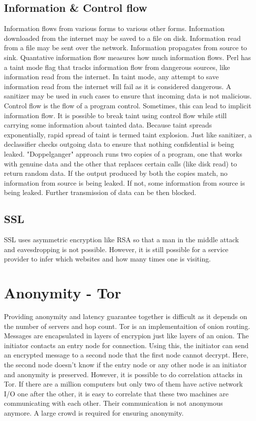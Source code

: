 \documentclass[twoside]{article}
\begin{document}
\subsection{Information \& Control flow}
Information flows from various forms to various other forms. Information downloaded from the internet may be saved to a file on disk. Information read from a file may be sent over the network. Information propagates from source to sink. Quantative information flow measures how much information flows. Perl has a taint mode flag that tracks information flow from dangerous sources, like information read from the internet. In taint mode, any attempt to save information read from the internet will fail as it is considered dangerous. A sanitizer may be used in such cases to ensure that incoming data is not malicious. Control flow is the flow of a program control. Sometimes, this can lead to implicit information flow. It is possible to break taint using control flow while still carrying some information about tainted data. Because taint spreads exponentially, rapid spread of taint is termed taint explosion. Just like sanitizer, a declassifier checks outgoing data to ensure that nothing confidential is being leaked. "Doppelganger" approach runs two copies of a program, one that works with genuine data and the other that replaces certain calls (like disk read) to return random data. If the output produced by both the copies match, no information from source is being leaked. If not, some information from source is being leaked. Further transmission of data can be then blocked. 

\subsection{SSL}
SSL uses asymmetric encryption like RSA so that a man in the middle attack and eavesdropping is not possible. However, it is still possible for a service provider to infer which websites and how many times one is visiting.

\section{Anonymity - Tor}
Providing anonymity and latency guarantee together is difficult as it depends on the number of servers and hop count. Tor is an implementaition of onion routing. Messages are encapsulated in layers of encrypion just like layers of an onion. The initiator contacts an entry node for connection. Using this, the initiator can send an encrypted message to a second node that the first node cannot decrypt. Here, the second node doesn't know if the entry node or any other node is an initiator and anonymity is preserved. However, it is possible to do correlation attacks in Tor. If there are a million computers but only two of them have active network I/O one after the other, it is easy to correlate that these two machines are communicating with each other. Their communication is not anonymous anymore. A large crowd is required for ensuring anonymity.
\end{document}
